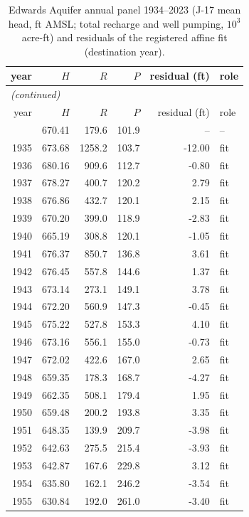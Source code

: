 \documentclass[11pt,a4paper]{article}
\begin{document}
\endgroup

\begingroup\footnotesize\setlength{\tabcolsep}{3pt}
\begin{longtable}{rrrrrl}
\caption{Edwards Aquifer annual panel 1934--2023 (J-17 mean head, ft AMSL; total recharge and well pumping, $10^3$ acre-ft) and residuals of the registered affine fit (destination year).}\label{tab:si-edw-data}\\
\toprule
year & $H$ & $R$ & $P$ & residual (ft) & role \\
\midrule
\endfirsthead
\multicolumn{6}{l}{\emph{(continued)}}\\
\toprule
year & $H$ & $R$ & $P$ & residual (ft) & role \\
\midrule
\endhead
\bottomrule
\endfoot
1934 & 670.41 & 179.6 & 101.9 & -- & -- \\
1935 & 673.68 & 1258.2 & 103.7 & -12.00 & fit \\
1936 & 680.16 & 909.6 & 112.7 & -0.80 & fit \\
1937 & 678.27 & 400.7 & 120.2 & 2.79 & fit \\
1938 & 676.86 & 432.7 & 120.1 & 2.15 & fit \\
1939 & 670.20 & 399.0 & 118.9 & -2.83 & fit \\
1940 & 665.19 & 308.8 & 120.1 & -1.05 & fit \\
1941 & 676.37 & 850.7 & 136.8 & 3.61 & fit \\
1942 & 676.45 & 557.8 & 144.6 & 1.37 & fit \\
1943 & 673.14 & 273.1 & 149.1 & 3.78 & fit \\
1944 & 672.20 & 560.9 & 147.3 & -0.45 & fit \\
1945 & 675.22 & 527.8 & 153.3 & 4.10 & fit \\
1946 & 673.16 & 556.1 & 155.0 & -0.73 & fit \\
1947 & 672.02 & 422.6 & 167.0 & 2.65 & fit \\
1948 & 659.35 & 178.3 & 168.7 & -4.27 & fit \\
1949 & 662.35 & 508.1 & 179.4 & 1.95 & fit \\
1950 & 659.48 & 200.2 & 193.8 & 3.35 & fit \\
1951 & 648.35 & 139.9 & 209.7 & -3.98 & fit \\
1952 & 642.63 & 275.5 & 215.4 & -3.93 & fit \\
1953 & 642.87 & 167.6 & 229.8 & 3.12 & fit \\
1954 & 635.80 & 162.1 & 246.2 & -3.54 & fit \\
1955 & 630.84 & 192.0 & 261.0 & -3.40 & fit \\

\end{longtable}
\end{document}
